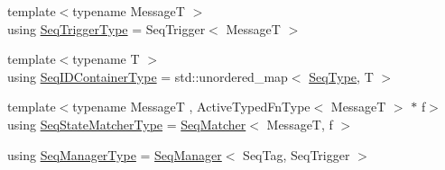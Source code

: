 \begin{DoxyCompactItemize}
\item 
{\footnotesize template$<$typename MessageT $>$ }\\using \hyperlink{structvt_1_1seq_1_1_tagged_sequencer_a4b015f2f7d3197a66af5576f0e63a834}{Seq\+Trigger\+Type} = Seq\+Trigger$<$ MessageT $>$
\item 
{\footnotesize template$<$typename T $>$ }\\using \hyperlink{structvt_1_1seq_1_1_tagged_sequencer_a718515267468123a9036c30033d74237}{Seq\+I\+D\+Container\+Type} = std\+::unordered\+\_\+map$<$ \hyperlink{structvt_1_1seq_1_1_tagged_sequencer_a1c8ee839258d0f88c49ef660267a81d5}{Seq\+Type}, T $>$
\item 
{\footnotesize template$<$typename MessageT , Active\+Typed\+Fn\+Type$<$ Message\+T $>$ $\ast$ f$>$ }\\using \hyperlink{structvt_1_1seq_1_1_tagged_sequencer_a8b215c5e7be7295118d6d0716f3a8052}{Seq\+State\+Matcher\+Type} = \hyperlink{structvt_1_1seq_1_1_seq_matcher}{Seq\+Matcher}$<$ MessageT, f $>$
\item 
using \hyperlink{structvt_1_1seq_1_1_tagged_sequencer_a892e0a759dc975bf74e35f9ebf7a2967}{Seq\+Manager\+Type} = \hyperlink{structvt_1_1seq_1_1_seq_manager}{Seq\+Manager}$<$ Seq\+Tag, Seq\+Trigger $>$
\end{DoxyCompactItemize}
